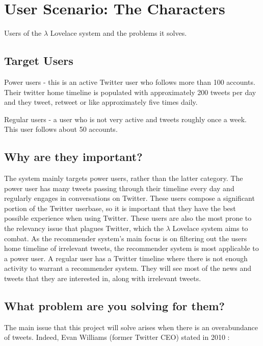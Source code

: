 \documentclass{article}
\begin{document}
\section{User Scenario: The Characters} 


Users of the $\lambda$ Lovelace system and the problems it solves.

\subsection{Target Users}
\begin{itemize*}
    \item Power users - this is an active Twitter user who follows more than 100 accounts. Their twitter home timeline is populated with approximately 200 tweets per day and they tweet, retweet or like approximately five times daily.
    \item Regular users - a user who is not very active and tweets roughly once a week. This user follows about 50 accounts.
    
    
\end{itemize*} 


\subsection{Why are they important?}
The system mainly targets power users, rather than the latter category. The power user has many tweets passing through their timeline every day and regularly engages in conversations on Twitter. These users compose a significant portion of the Twitter userbase, so it is important that they have the best possible experience when using Twitter. These users are also the most prone to the relevancy issue that plagues Twitter, which the $\lambda$ Lovelace system aims to combat.
As the recommender system's main focus is on filtering out the users home timeline of irrelevant tweets, the recommender system is most applicable to a power user. A regular user has a Twitter timeline where there is not enough activity to warrant a recommender system. They will see most of the news and tweets that they are interested in, along with irrelevant tweets. 

\subsection{What problem are you solving for them?}
The main issue that this project will solve arises when there is an overabundance of tweets. Indeed, Evan Williams (former Twitter CEO) stated in 2010 \cite{ceo}:
\end{document}
